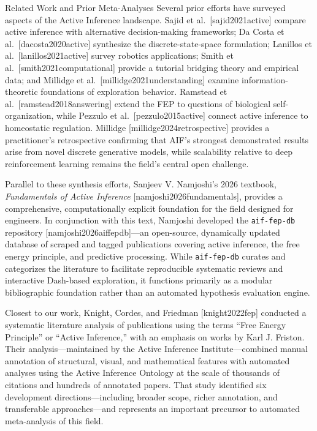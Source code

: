 \documentclass[
  ignorenonframetext,
]{beamer}
\providecommand{\citep}[1]{[#1]}
\begin{document}
\begin{frame}{Related Work and Prior
Meta-Analyses}
\protect{}\label{related-work-and-prior-meta-analyses}
Several prior efforts have surveyed aspects of the Active Inference
landscape. Sajid et al.~\citep{sajid2021active} compare active inference
with alternative decision-making frameworks; Da Costa et
al.~\citep{dacosta2020active} synthesize the discrete-state-space
formulation; Lanillos et al.~\citep{lanillos2021active} survey robotics
applications; Smith et al.~\citep{smith2021computational} provide a
tutorial bridging theory and empirical data; and Millidge et
al.~\citep{millidge2021understanding} examine information-theoretic
foundations of exploration behavior. Ramstead et
al.~\citep{ramstead2018answering} extend the FEP to questions of
biological self-organization, while Pezzulo et
al.~\citep{pezzulo2015active} connect active inference to homeostatic
regulation. Millidge \citep{millidge2024retrospective} provides a
practitioner's retrospective confirming that AIF's strongest
demonstrated results arise from novel discrete generative models, while
scalability relative to deep reinforcement learning remains the field's
central open challenge.

Parallel to these synthesis efforts, Sanjeev V. Namjoshi's 2026
textbook, \emph{Fundamentals of Active Inference}
\citep{namjoshi2026fundamentals}, provides a comprehensive,
computationally explicit foundation for the field designed for
engineers. In conjunction with this text, Namjoshi developed the
\texttt{aif-fep-db} repository \citep{namjoshi2026aiffepdb}---an
open-source, dynamically updated database of scraped and tagged
publications covering active inference, the free energy principle, and
predictive processing. While \texttt{aif-fep-db} curates and categorizes
the literature to facilitate reproducible systematic reviews and
interactive Dash-based exploration, it functions primarily as a modular
bibliographic foundation rather than an automated hypothesis evaluation
engine.

Closest to our work, Knight, Cordes, and Friedman \citep{knight2022fep}
conducted a systematic literature analysis of publications using the
terms ``Free Energy Principle'' or ``Active Inference,'' with an
emphasis on works by Karl J. Friston. Their analysis---maintained by the
Active Inference Institute---combined manual annotation of structural,
visual, and mathematical features with automated analyses using the
Active Inference Ontology at the scale of thousands of citations and
hundreds of annotated papers. That study identified six development
directions---including broader scope, richer annotation, and
transferable approaches---and represents an important precursor to
automated meta-analysis of this field.


\end{frame}
\end{document}
